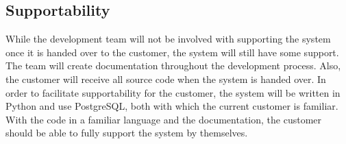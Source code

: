 \subsection{Supportability}
While the development team will not be involved with supporting the system once it is handed over to the customer, the system will still have some support.  The team will create documentation throughout the development process. Also, the customer will receive all source code when the system is handed over.  In order to facilitate supportability for the customer, the system will be written in Python and use \gls{PostgreSQL}, both with which the current customer is familiar.  With the code in a familiar language and the documentation, the customer should be able to fully support the system by themselves.
